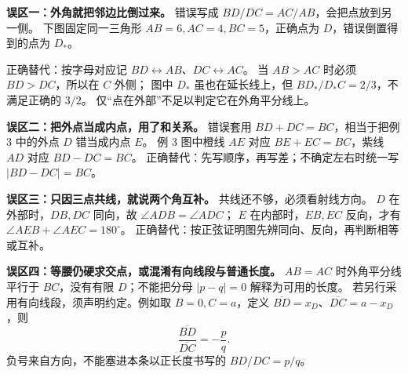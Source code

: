 \begin{trapbox}
\textbf{误区一：外角就把邻边比倒过来。}
错误写成 $BD/DC=AC/AB$，会把点放到另一侧。
下图固定同一三角形 $AB=6,AC=4,BC=5$，正确点为 $D$，错误倒置得到的点为 $D_*$。

正确替代：按字母对应记 $BD\leftrightarrow AB$、$DC\leftrightarrow AC$。
当 $AB>AC$ 时必须 $BD>DC$，所以在 $C$ 外侧；
图中 $D_*$ 虽也在延长线上，但 $BD_*/D_*C=2/3$，不满足正确的 $3/2$。
仅“点在外部”不足以判定它在外角平分线上。

\textbf{误区二：把外点当成内点，用了和关系。}
错误套用 $BD+DC=BC$，相当于把例 3 中的外点 $D$ 错当成内点 $E$。
例 3 图中橙线 $AE$ 对应 $BE+EC=BC$，紫线 $AD$ 对应 $BD-DC=BC$。
正确替代：先写顺序，再写差；不确定左右时统一写 $|BD-DC|=BC$。

\textbf{误区三：只因三点共线，就说两个角互补。}
共线还不够，必须看射线方向。
$D$ 在外部时，$DB,DC$ 同向，故 $\angle ADB=\angle ADC$；
$E$ 在内部时，$EB,EC$ 反向，才有 $\angle AEB+\angle AEC=180^\circ$。
正确替代：按正弦证明图先辨同向、反向，再判断相等或互补。

\textbf{误区四：等腰仍硬求交点，或混淆有向线段与普通长度。}
$AB=AC$ 时外角平分线平行于 $BC$，没有有限 $D$；不能把分母 $|p-q|=0$ 解释为可用的长度。
若另行采用有向线段，须声明约定。例如取 $B=0,C=a$，定义
$\overline{BD}=x_D$、$\overline{DC}=a-x_D$，则
\[
 \frac{\overline{BD}}{\overline{DC}}=-\frac pq.
\]
负号来自方向，不能塞进本条以正长度书写的 $BD/DC=p/q$。
\end{trapbox}
